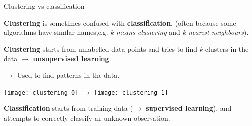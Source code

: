 \documentclass[compress]{beamer}
\begin{document}
%
%
%

%
%
%
%    
%
%
%
%


\begin{frame}{Clustering vs classification}

\textbf{Clustering} is sometimes confused with \textbf{classification}.  (often
    because some algorithms have similar names,e.g. \emph{k-means clustering}
    and \emph{k-nearest neighbours}).

\textbf{Clustering} starts from unlabelled data points and tries to find
    $k$ clusters in the data $\rightarrow$ \textbf{unsupervised learning}.


$\rightarrow$ Used to find patterns in the data.

    \begin{center}
        \texttt{[image: clustering-0]}
        $\rightarrow$
        \texttt{[image: clustering-1]}
    \end{center}


    \textbf{Classification} starts from training data ($\rightarrow$
    \textbf{supervised learning}), and attempts to correctly classify an
    unknown observation.

\end{frame}
\end{document}
